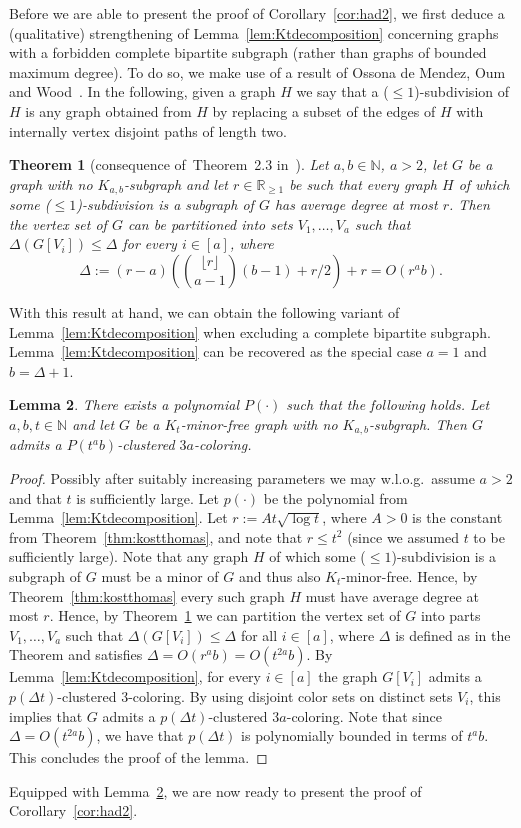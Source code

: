\documentclass[10pt]{amsart}
\newtheorem{theorem}{Theorem}[section]
\newtheorem{lemma}[theorem]{Lemma}
\theoremstyle{definition}
\begin{document}
Before we are able to present the proof of Corollary~\ref{cor:had2}, we first deduce a (qualitative) strengthening of Lemma~\ref{lem:Ktdecomposition} concerning graphs with a forbidden complete bipartite subgraph (rather than graphs of bounded maximum degree). To do so, we make use of a result of Ossona de Mendez, Oum and Wood~\cite{demendez}. In the following, given a graph $H$ we say that a ($\le 1$)-subdivision of $H$ is any graph obtained from $H$ by replacing a subset of the edges of $H$ with internally vertex disjoint paths of length two.

\begin{theorem}[consequence of~Theorem~2.3 in~\cite{demendez}]\label{thm:demendez}
Let $a,b\in \mathbb{N}$, $a>2$, let $G$ be a graph with no $K_{a,b}$-subgraph and let $r\in \mathbb{R}_{\ge 1}$ be such that every graph $H$ of which some ($\le 1$)-subdivision is a subgraph of $G$ has average degree at most $r$. Then the vertex set of $G$ can be partitioned into sets $V_1,\ldots,V_a$ such that $\Delta(G[V_i])\le \Delta$ for every $i\in [a]$, where $$\Delta:=(r-a)\left(\binom{\lfloor r\rfloor}{a-1}(b-1)+r/2\right)+r=O(r^ab).$$
\end{theorem}
With this result at hand, we can obtain the following variant of Lemma~\ref{lem:Ktdecomposition} when excluding a complete bipartite subgraph.
Lemma~\ref{lem:Ktdecomposition} can be recovered as the special case $a=1$ and $b=\Delta+1$.
\begin{lemma}\label{lem:noKab}
There exists a polynomial $P(\cdot)$ such that the following holds. Let $a,b,t\in \mathbb{N}$ and let $G$ be a $K_t$-minor-free graph with no $K_{a,b}$-subgraph. Then $G$ admits a $P(t^ab)$-clustered $3a$-coloring.
\end{lemma}
\begin{proof}
Possibly after suitably increasing parameters we may w.l.o.g.~assume $a>2$ and that $t$ is sufficiently large. Let $p(\cdot)$ be the polynomial from Lemma~\ref{lem:Ktdecomposition}. Let $r:=At\sqrt{\log t}$, where $A>0$ is the constant from Theorem~\ref{thm:kostthomas}, and note that $r\le t^2$ (since we assumed $t$ to be sufficiently large). Note that any graph $H$ of which some ($\le 1$)-subdivision is a subgraph of $G$ must be a minor of $G$ and thus also $K_t$-minor-free. Hence, by Theorem~\ref{thm:kostthomas} every such graph $H$ must have average degree at most $r$. Hence, by Theorem~\ref{thm:demendez} we can partition the vertex set of $G$ into parts $V_1,\ldots,V_a$ such that $\Delta(G[V_i])\le \Delta$ for all $i\in [a]$, where $\Delta$ is defined as in the Theorem and satisfies $\Delta=O(r^ab)=O(t^{2a}b)$. By Lemma~\ref{lem:Ktdecomposition}, for every $i\in [a]$ the graph $G[V_i]$ admits a $p(\Delta t)$-clustered $3$-coloring. By using disjoint color sets on distinct sets $V_i$, this implies that $G$ admits a $p(\Delta t)$-clustered $3a$-coloring. Note that since $\Delta=O(t^{2a}b)$, we have that $p(\Delta t)$ is polynomially bounded in terms of $t^ab$. This concludes the proof of the lemma.
\end{proof}
Equipped with Lemma~\ref{lem:noKab}, we are now ready to present the proof of Corollary~\ref{cor:had2}.
    
\end{document}
